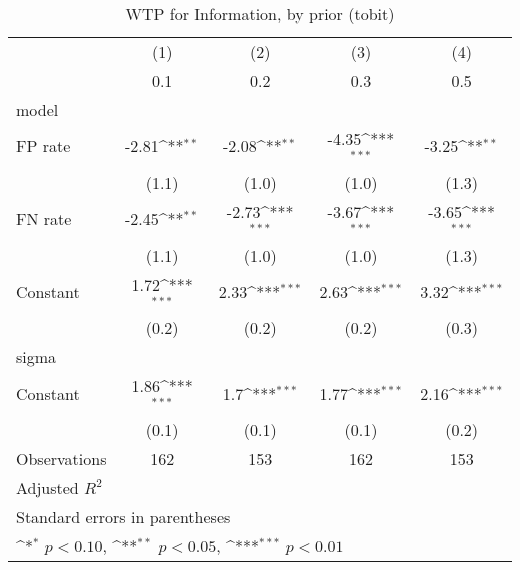 \begin{table}[htbp]\centering
\def\sym#1{\ifmmode^{#1}\else\(^{#1}\)\fi}
\caption{WTP for Information, by prior (tobit)}
\begin{tabular}{l*{4}{c}}
\hline\hline
                &\multicolumn{1}{c}{(1)}&\multicolumn{1}{c}{(2)}&\multicolumn{1}{c}{(3)}&\multicolumn{1}{c}{(4)}\\
                &\multicolumn{1}{c}{0.1}&\multicolumn{1}{c}{0.2}&\multicolumn{1}{c}{0.3}&\multicolumn{1}{c}{0.5}\\
\hline
model           &                  &                  &                  &                  \\
FP rate         &    -2.81\sym{**} &    -2.08\sym{**} &    -4.35\sym{***}&    -3.25\sym{**} \\
                &    (1.1)         &    (1.0)         &    (1.0)         &    (1.3)         \\
FN rate         &    -2.45\sym{**} &    -2.73\sym{***}&    -3.67\sym{***}&    -3.65\sym{***}\\
                &    (1.1)         &    (1.0)         &    (1.0)         &    (1.3)         \\
Constant        &     1.72\sym{***}&     2.33\sym{***}&     2.63\sym{***}&     3.32\sym{***}\\
                &    (0.2)         &    (0.2)         &    (0.2)         &    (0.3)         \\
\hline
sigma           &                  &                  &                  &                  \\
Constant        &     1.86\sym{***}&      1.7\sym{***}&     1.77\sym{***}&     2.16\sym{***}\\
                &    (0.1)         &    (0.1)         &    (0.1)         &    (0.2)         \\
\hline
Observations    &      162         &      153         &      162         &      153         \\
Adjusted \(R^{2}\)&                  &                  &                  &                  \\
\hline\hline
\multicolumn{5}{l}{\footnotesize Standard errors in parentheses}\\
\multicolumn{5}{l}{\footnotesize \sym{*} \(p<0.10\), \sym{**} \(p<0.05\), \sym{***} \(p<0.01\)}\\
\end{tabular}
\end{table}
